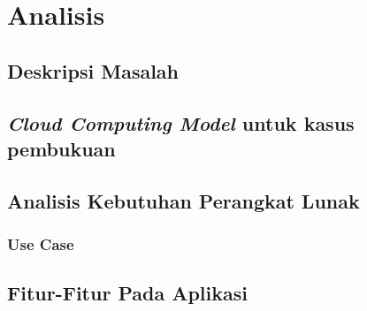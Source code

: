 \chapter{Analisis}
\label{chap:analisis}

\section{Deskripsi Masalah}
\label{sec:deskripsimasalah}

\section{\textit{Cloud Computing Model} untuk kasus pembukuan}

\section{Analisis Kebutuhan Perangkat Lunak}
\label{sec:akpl}

\subsection{Use Case}
\label{sec:usecase}

\section{Fitur-Fitur Pada Aplikasi}
\label{sec:fiturfiturpadaaplikasi}